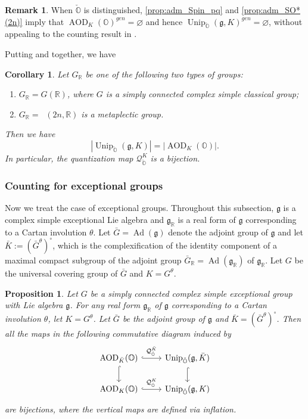 \documentclass[11pt, a4paper]{amsart}
\newcommand{\g}{\mathfrak{g}}
\newcommand{\orb}{\mathbb{O}}
\newcommand{\ckorb}{\check{\orb}}
\DeclareMathOperator{\Ad}{Ad}
\DeclareMathOperator{\AOD}{AOD}
\DeclareMathOperator{\Unip}{Unip}
\DeclareMathOperator{\Mp}{\widetilde{Sp}}
\newcommand{\AODK}{\AOD_K}
\newcommand{\UnipOv}{\Unip_{\ckorb}}
\newcommand{\R}{\mathbb{R}}
\newcommand{\quan}{\mathcal{Q}}
\newcommand{\GR}{G_\R}
\newtheorem{Prop}[Thm]{Proposition}
\newtheorem{Cor}[Thm]{Corollary}
\theoremstyle{definition}
\newtheorem{Rem}[Thm]{Remark}
\numberwithin{equation}{section}
\begin{document}
\begin{Rem}
    When $\ckorb$ is distinguished, \cref{prop:adm_Spin_pq} and \cref{prop:adm_SO*(2n)} imply that $\AODK(\orb)^{gen} = \varnothing$ and hence $\UnipOv(\g, K)^{gen} = \varnothing$, without appealing to the counting result in \cite[Theorem 3]{BMSZ:spin}.
\end{Rem}

Putting  and  together, we have

\begin{Cor} \label{cor:counting_classical}
	Let $\GR$ be one of the following two types of groups:
	\begin{enumerate}
		\item $\GR = G(\R)$, where $G$ is a simply connected complex simple classical group;
		\item $\GR = \Mp(2n,\R)$ is a metaplectic group.
	\end{enumerate}	
	Then we have
	\[ |\UnipOv(\g, K)| = |\AODK(\orb)|. \]
	In particular, the quantization map $\quan_{\ckorb}^K$ is a bijection.
\end{Cor}

\subsubsection{Counting for exceptional groups} \label{subsubsec:counting_exceptional}

Now we treat the case of exceptional groups. Throughout this subsection, $\g$ is a complex simple exceptional Lie algebra and $\g_\R$ is a real form of $\g$ corresponding to a Cartan involution $\theta$. Let $\bar{G} = \Ad(\g)$ denote the adjoint group of $\g$ and let $\bar{K} := (\bar{G}^\theta)^\circ$, which is the complexification of the identity component of a maximal compact subgroup of the adjoint group $\bar{G}_\R = \Ad(\g_\R)$ of $\g_\R$. Let $G$ be the universal covering group of $\bar{G}$ and $K = G^\theta$.

\begin{Prop} \label{prop:counting_exceptional}
	Let $G$ be a simply connected complex simple exceptional group with Lie algebra $\g$. For any real form $\g_\R$ of $\g$ corresponding to a Cartan involution $\theta$, let $K = G^\theta$. Let $\bar{G}$ be the adjoint group of $\g$ and $\bar{K} = (\bar{G}^\theta)^\circ$. Then all the maps in the following commutative diagram induced by 
	\begin{equation} \label{eq:quant_infl_exceptional}
		\begin{tikzcd}
			\AOD_{\bar{K}}(\orb) \ar[d, hook] \ar[r,hook, "\quan_{\ckorb}^{\bar{K}}"] & \UnipOv(\g, \bar{K}) \ar[d, hook] \\
			\AODK(\orb) \ar[r, hook, "\quan_{\ckorb}^{K}"] & \UnipOv(\g, K) 
		\end{tikzcd}
	\end{equation}
	are bijections, where the vertical maps are defined via inflation.
\end{Prop}
\end{document}
